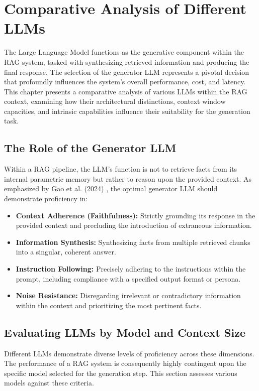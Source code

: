 \chapter{Comparative Analysis of Different LLMs}
\label{chap:llm_comparison}

The Large Language Model functions as the generative component within the RAG system, tasked with synthesizing retrieved information and producing the final response. The selection of the generator LLM represents a pivotal decision that profoundly influences the system's overall performance, cost, and latency. This chapter presents a comparative analysis of various LLMs within the RAG context, examining how their architectural distinctions, context window capacities, and intrinsic capabilities influence their suitability for the generation task.

\section{The Role of the Generator LLM}
Within a RAG pipeline, the LLM's function is not to retrieve facts from its internal parametric memory but rather to reason upon the provided context. As emphasized by Gao et al. (2024) \autocite{gao2024retrievalaugmentedgenerationlargelanguage}, the optimal generator LLM should demonstrate proficiency in:
\begin{itemize}
    \item \textbf{Context Adherence (Faithfulness):} Strictly grounding its response in the provided context and precluding the introduction of extraneous information.
    \item \textbf{Information Synthesis:} Synthesizing facts from multiple retrieved chunks into a singular, coherent answer.
    \item \textbf{Instruction Following:} Precisely adhering to the instructions within the prompt, including compliance with a specified output format or persona.
    \item \textbf{Noise Resistance:} Disregarding irrelevant or contradictory information within the context and prioritizing the most pertinent facts.
\end{itemize}

\section{Evaluating LLMs by Model and Context Size}
Different LLMs demonstrate diverse levels of proficiency across these dimensions. The performance of a RAG system is consequently highly contingent upon the specific model selected for the generation step. This section assesses various models against these criteria.

